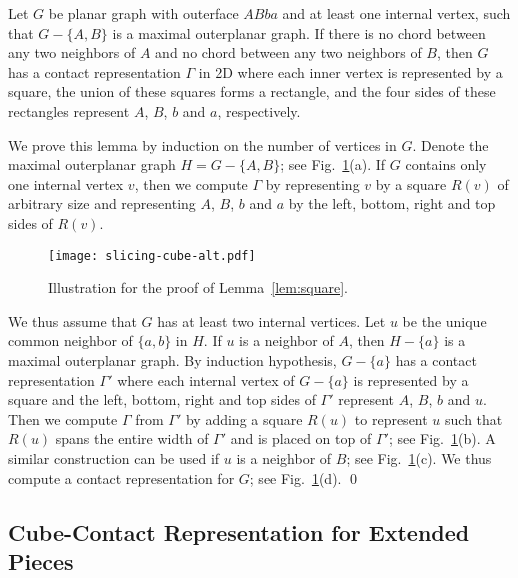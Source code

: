 \documentclass{llncs}
\renewenvironment{proof}{\medskip\noindent{\bf Proof:}}{\mbox{}\hfill\qed\par}
\begin{document}
\begin{lemma}
	\label{lem:square} Let $G$ be planar graph with outerface $ABba$ and at least one
	internal vertex, such that $G-\{A,B\}$ is a maximal outerplanar graph. If there is no
	chord between any two neighbors of $A$ and no chord between any two neighbors of
	$B$, then $G$ has a contact representation $\Gamma$ in 2D where each inner vertex
	is represented by a square, the union of these squares forms a rectangle,
	and the four sides of these rectangles represent $A$, $B$, $b$ and $a$, respectively.
\end{lemma}
\begin{proof}
 We prove this lemma by induction on the number of vertices in $G$. Denote the
 maximal outerplanar graph $H=G-\{A,B\}$; see Fig.~\ref{fig:square}(a). If $G$ contains
 only one internal vertex $v$, then we compute $\Gamma$ by
 representing $v$ by a square $R(v)$ of arbitrary size and representing $A$, $B$, $b$
 and $a$ by the left, bottom, right and top sides of $R(v)$.


\begin{figure}[t]
\centering
	\texttt{[image: slicing-cube-alt.pdf]}
	\caption{Illustration for the proof of Lemma~\ref{lem:square}.}
	\label{fig:square}
\end{figure}


 We thus assume that $G$ has at least two internal vertices. Let $u$ be the unique common
 neighbor of $\{a, b\}$ in $H$. If $u$ is a neighbor of $A$, then $H-\{a\}$ is a maximal
 outerplanar graph. By induction hypothesis, $G-\{a\}$ has a contact representation
 $\Gamma'$ where each internal vertex of $G-\{a\}$ is represented by a square and the left,
 bottom, right and top sides of $\Gamma'$ represent $A$, $B$, $b$ and $u$. Then we
 compute $\Gamma$ from $\Gamma'$ by adding a square $R(u)$ to represent $u$ such
 that $R(u)$ spans the entire width of $\Gamma'$ and is placed on top of $\Gamma'$; see
 Fig.~\ref{fig:square}(b). A similar construction can be used if $u$ is a neighbor of $B$; see
Fig.~\ref{fig:square}(c).
We thus compute a contact representation for $G$; see Fig.~\ref{fig:square}(d).
\end{proof}





\subsection{Cube-Contact Representation for Extended Pieces}
\end{document}

